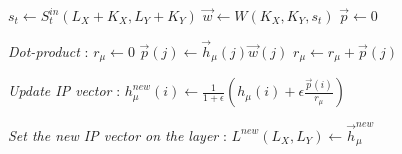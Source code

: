 \begin{algorithm}
\begin{algorithmic}[1]
			\STATE $s_t \leftarrow S_t^{in}(L_X+K_X,L_Y+K_Y)$
			\STATE $\vec{w} \leftarrow W(K_X,K_Y,s_t)$
			\STATE $\vec{p} \leftarrow 0$
			
			\textit{Dot-product} :
			\STATE $r_{\mu} \leftarrow 0$
				\STATE $\vec{p}(j) \leftarrow \vec{h}_{\mu}(j)\vec{w}(j)$
				\STATE $r_{\mu} \leftarrow r_{\mu} + \vec{p}(j)$
			\ENDFOR
			
			
				\textit{Update IP vector} :
				\STATE
				$  h_\mu^{new}(i) \leftarrow \frac{1}{1+\epsilon} \left(h_\mu(i) + \epsilon \frac{\vec{p}(i) }{r_{\mu}} \right) $
				\ENDFOR

				\textit{Set the new IP vector on the layer} :
				\STATE $L^{new}(L_X,L_Y) \leftarrow \vec{h}_\mu^{new}$
			\ENDIF
		\ENDFOR
	\ENDFOR
	
\end{algorithmic} 
\end{algorithm}

